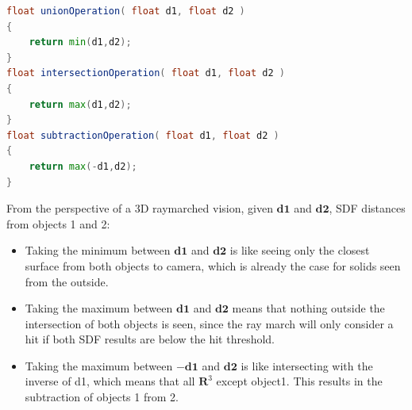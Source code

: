 \begin{lstlisting}[language=GLSL, caption={Code 5: SDF Union, Intersection and Subtraction}, label={lst:UnionIntersectionSubtraction} float=H]
float unionOperation( float d1, float d2 )
{
    return min(d1,d2);
}
float intersectionOperation( float d1, float d2 )
{
    return max(d1,d2);
}
float subtractionOperation( float d1, float d2 )
{
    return max(-d1,d2);
}
\end{lstlisting}

From the perspective of a 3D raymarched vision, given $\mathbf{d1}$ and $\mathbf{d2}$, SDF distances from objects 1 and 2:

\begin{itemize}
    \item Taking the minimum between $\mathbf{d1}$ and $\mathbf{d2}$ is like seeing only the closest surface from both objects to camera, which is already the case for solids seen from the outside.
    \item Taking the maximum between $\mathbf{d1}$ and $\mathbf{d2}$ means that nothing outside the intersection of both objects is seen, since the ray march will only consider a hit if both SDF results are below the hit threshold.
    \item Taking the maximum between $\mathbf{-d1}$ and $\mathbf{d2}$ is like intersecting with the inverse of d1, which means that all $\mathbf{R}^3 $ except object1. This results in the subtraction of objects 1 from 2.
\end{itemize}


